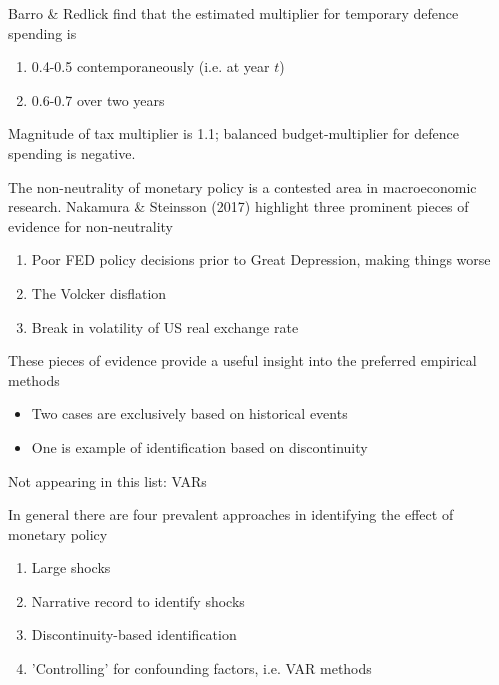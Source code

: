 \documentclass{beamer}
\begin{document}
\begin{frame}
  Barro \& Redlick find that the estimated multiplier for temporary defence spending is
 \begin{enumerate}
   \item 0.4-0.5 contemporaneously (i.e. at year $t$)
   \item 0.6-0.7 over two years
 \end{enumerate}
 \medskip
 Magnitude of tax multiplier is 1.1; balanced budget-multiplier for defence spending is negative.   
\end{frame}

\begin{frame}
 The non-neutrality of monetary policy is a contested area in macroeconomic research.  
 Nakamura \& Steinsson (2017) highlight three prominent pieces of evidence for non-neutrality
 \medskip
 \begin{enumerate}
   \item Poor FED policy decisions prior to Great Depression, making things worse
   \item The Volcker disflation
   \item Break in volatility of US real exchange rate
 \end{enumerate} 
\end{frame}

\begin{frame}
  These pieces of evidence provide a useful insight into the preferred empirical methods
  \medskip  
  \begin{itemize}
    \item Two cases are exclusively based on historical events
    \item One is example of identification based on discontinuity
  \end{itemize}
  \medskip
  Not appearing in this list: VARs
\end{frame}

\begin{frame}
  In general there are four prevalent approaches in identifying the effect of monetary policy
  \begin{enumerate}
    \item Large shocks
    \item Narrative record to identify shocks
    \item Discontinuity-based identification    
    \item 'Controlling' for confounding factors, i.e. VAR methods
  \end{enumerate}
\end{frame}
\end{document}
